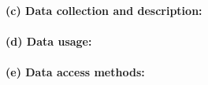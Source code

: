 \paragraph{(c) Data collection and description:}
\paragraph{(d) Data usage:}
\paragraph{(e) Data access methods:}




